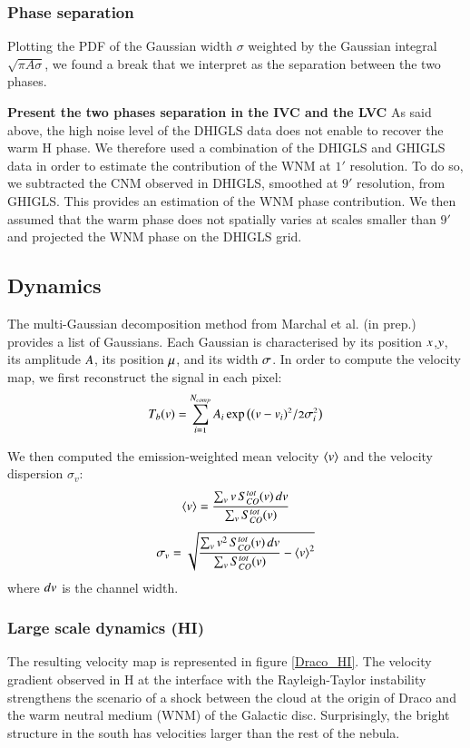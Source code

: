 \documentclass[traditabstract]{aa}
\begin{document}
\subsubsection{Phase separation}
Plotting the PDF of the Gaussian width $\sigma$ weighted by the Gaussian integral $\sqrt{\pi A\sigma}$, we found a break 
that we interpret as the separation between the two phases.

\textbf{Present the two phases separation in the IVC and the LVC}
As said above, the high noise level of the DHIGLS data does not enable to recover the warm H phase. 
We therefore used a combination of the DHIGLS and GHIGLS data in order to estimate the contribution of the WNM at $1'$ resolution. 
To do so, we subtracted the CNM observed in DHIGLS, smoothed at $9'$ resolution, from GHIGLS. This provides an estimation 
of the WNM phase contribution. We then assumed that the warm phase does not spatially varies at scales smaller than $9'$ 
and projected the WNM phase on the DHIGLS grid.

\subsection{Dynamics}
The multi-Gaussian decomposition method from Marchal et al. (in prep.) provides a list of Gaussians. Each Gaussian is characterised by its position $\mathnormal{x}$,$\mathnormal{y}$, its amplitude $\mathnormal{A}$, its position $\mathnormal{\mu}$, and its width $\mathnormal{\sigma}$. In order to compute the velocity map, we first reconstruct the signal in each pixel:
\begin{equation}
  \mathnormal{T_b(v)=\sum_{i=1}^{N_{comp}} A_i \exp\left( (v-v_i)^2/2\sigma_i^2 \right)}
\end{equation}

We then computed the emission-weighted mean velocity $\left< v \right>$ and the velocity dispersion $\sigma_v$:
\begin{equation}
  \mathnormal{\left< v \right>=\frac{\sum_v v\, S_{CO}^{tot}(v)\, dv}{\sum_v S_{CO}^{tot}(v)}}
\end{equation}
\begin{equation}
  \mathnormal{\sigma_v=\sqrt{\frac{\sum_v v^2\, S_{CO}^{tot}(v)\, dv}{\sum_v S_{CO}^{tot}(v)}-\left< v \right>^2}}
\end{equation} 
where $\mathnormal{dv}$ is the channel width.

\subsubsection{Large scale dynamics (HI)}
The resulting velocity map is represented in figure \ref{Draco_HI}. The velocity gradient observed in H at the interface with the Rayleigh-Taylor instability strengthens the scenario of a shock between the cloud at the origin of Draco and the warm neutral medium (WNM) of the Galactic disc.
Surprisingly, the bright structure in the south has velocities larger than the rest of the nebula.
\end{document}

